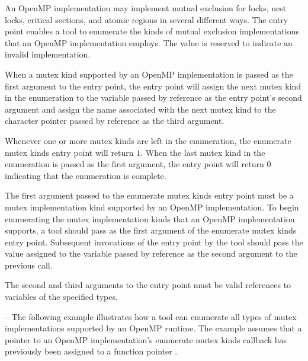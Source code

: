 \descr
An OpenMP implementation may implement mutual exclusion for locks,
nest locks, critical sections, and atomic regions in several different
ways.  The  entry point
enables a tool to enumerate the 
kinds of mutual exclusion implementations that an OpenMP implementation
employs.
The value  is reserved to indicate an invalid
implementation.

\begin{comment}
For that reason, a user program can provide hints
to help the runtime system to select appropriate implementations.
When a lock or nest lock is initialized, the \code{ompt\_callback\_init\_lock}
callback receives the argument \code{kind}---a small integer that
indicates the lock implementation chosen by the OpenMP runtime.
Similarly, the \code{ompt\_callback\_mutex\_acquire} callback receives
the argument \code{kind} to indicate the implementation of a lock,
critical section, atomic region, or ordered section. 
\end{comment}

When a mutex kind supported by an OpenMP implementation is passed
as the first argument to the entry point,
the entry point will assign the next mutex kind in the enumeration to
the variable passed by reference as the entry point's second argument
and assign the name associated with the next mutex kind 
to the character pointer passed by reference as the third argument.

Whenever one or more mutex kinds are left in the enumeration, 
the enumerate mutex kinds entry point will return $1$.
When the last mutex kind in the enumeration is passed 
as the first argument, the entry point will return $0$ 
indicating that the enumeration is complete.

\constraints
The first argument passed to the enumerate mutex kinds entry point must be
a mutex implementation kind supported
by an OpenMP implementation.  To begin enumerating the mutex
implementation kinds that an OpenMP implementation supports, a tool
should pass  as the first
argument of the enumerate mutex kinds entry point.  Subsequent invocations
of the entry point by the tool should pass the
value assigned to the variable passed by reference as the second
argument to the previous call.

The second and third arguments to the entry point must be valid
references to variables of the specified types.

\notestart
\noteheader -- The following example illustrates how a tool can 
enumerate all types of mutex implementations supported by an OpenMP runtime.
The example assumes that a pointer to an OpenMP implementation's enumerate
mutex kinds callback has previously been assigned to a function pointer
.

